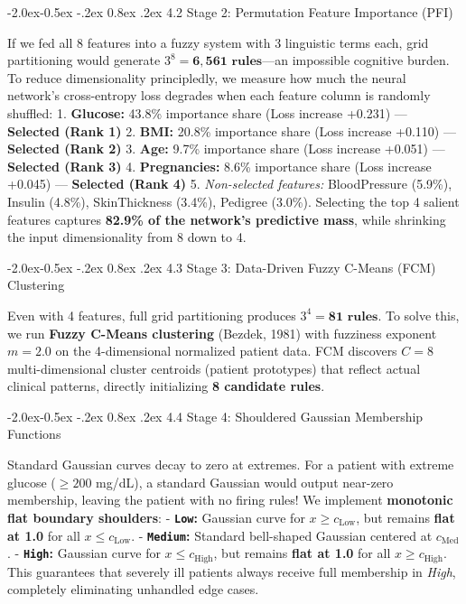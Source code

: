 \documentclass[10pt,a4paper]{article}
\makeatletter
\renewcommand\subsubsection{\@startsection{subsubsection}{3}{\z@}%
                                     {-2.0ex\@plus -0.5ex \@minus -.2ex}%
                                     {0.8ex \@plus .2ex}%
                                     {\normalfont\normalsize\bfseries\color{accent}}}
\makeatother
\begin{document}
\subsubsection{4.2 Stage 2: Permutation Feature Importance
(PFI)}\label{stage-2-permutation-feature-importance-pfi}

If we fed all 8 features into a fuzzy system with 3 linguistic terms
each, grid partitioning would generate
\(3^8 = \mathbf{6{,}561 \text{ rules}}\)---an impossible cognitive
burden. To reduce dimensionality principledly, we measure how much the
neural network's cross-entropy loss degrades when each feature column is
randomly shuffled: 1. \textbf{Glucose:} 43.8\% importance share (Loss
increase +0.231) --- \textbf{Selected (Rank 1)} 2. \textbf{BMI:} 20.8\%
importance share (Loss increase +0.110) --- \textbf{Selected (Rank 2)}
3. \textbf{Age:} 9.7\% importance share (Loss increase +0.051) ---
\textbf{Selected (Rank 3)} 4. \textbf{Pregnancies:} 8.6\% importance
share (Loss increase +0.045) --- \textbf{Selected (Rank 4)} 5.
\emph{Non-selected features:} BloodPressure (5.9\%), Insulin (4.8\%),
SkinThickness (3.4\%), Pedigree (3.0\%). Selecting the top 4 salient
features captures \textbf{82.9\% of the network's predictive mass},
while shrinking the input dimensionality from 8 down to 4.

\subsubsection{4.3 Stage 3: Data-Driven Fuzzy C-Means (FCM)
Clustering}\label{stage-3-data-driven-fuzzy-c-means-fcm-clustering}

Even with 4 features, full grid partitioning produces
\(3^4 = \mathbf{81 \text{ rules}}\). To solve this, we run \textbf{Fuzzy
C-Means clustering} (Bezdek, 1981) with fuzziness exponent \(m=2.0\) on
the 4-dimensional normalized patient data. FCM discovers \(C=8\)
multi-dimensional cluster centroids (patient prototypes) that reflect
actual clinical patterns, directly initializing \textbf{8 candidate
rules}.

\subsubsection{4.4 Stage 4: Shouldered Gaussian Membership
Functions}\label{stage-4-shouldered-gaussian-membership-functions}

Standard Gaussian curves decay to zero at extremes. For a patient with
extreme glucose (\(\ge 200\) mg/dL), a standard Gaussian would output
near-zero membership, leaving the patient with no firing rules! We
implement \textbf{monotonic flat boundary shoulders}: -
\textbf{\texttt{Low}:} Gaussian curve for \(x \ge c_{\text{Low}}\), but
remains \textbf{flat at 1.0} for all \(x \le c_{\text{Low}}\). -
\textbf{\texttt{Medium}:} Standard bell-shaped Gaussian centered at
\(c_{\text{Med}}\). - \textbf{\texttt{High}:} Gaussian curve for
\(x \le c_{\text{High}}\), but remains \textbf{flat at 1.0} for all
\(x \ge c_{\text{High}}\). This guarantees that severely ill patients
always receive full membership in \emph{High}, completely eliminating
unhandled edge cases.
\end{document}
